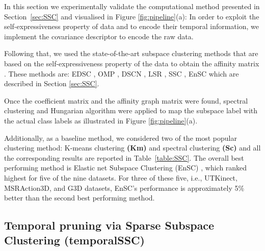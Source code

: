 \documentclass[10pt,a4paper,conference]{IEEEtran}
\begin{document}
In this section we experimentally validate the computational method presented in Section~\ref{sec:SSC} and visualised in Figure \ref{fig:pipeline}(a): In order to exploit the self-expressiveness property of data and to encode their temporal information, we implement the covariance descriptor to encode the raw data. 

Following that, we used the state-of-the-art subspace clustering methods that are based on the self-expressiveness property of the data to obtain the affinity matrix . These methods are: EDSC \cite{ji2014efficient}, OMP \cite{you2016scalable}, DSCN \cite{ji2017deep}, LSR \cite{lu2012robust}, SSC \cite{elhamifar2013sparse}, EnSC \cite{you2016oracle} which are described in Section \ref{sec:SSC}. 

Once the coefficient matrix  and the affinity graph matrix  were found, spectral clustering and Hungarian algorithm were applied to map the subspace label with the actual class labels \cite{vidal2011subspace} as illustrated in Figure \ref{fig:pipeline}(a).

Additionally, as a baseline method, we considered two of the most popular clustering method: K-means clustering \textbf{(Km)} and spectral clustering \textbf{(Sc)} \cite{pedregosa2011scikit} and all the corresponding results are reported in Table~\ref{table:SSC}. The overall best performing method is Elastic net Subspace Clustering (EnSC) \cite{you2016oracle}, which ranked highest for five of the nine datasets. For three of these five, i.e., UTKinect, MSRAction3D, and G3D datasets, EnSC's performance is approximately 5\% better than the second best performing method.

\subsection{Temporal pruning via Sparse Subspace Clustering (temporalSSC)}\label{sec:res_timeSSC}
\end{document}
